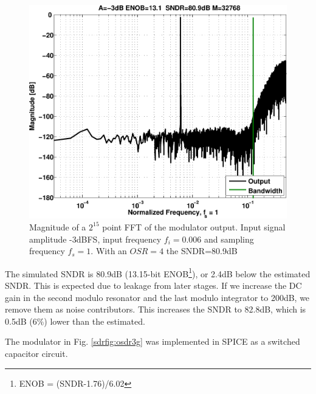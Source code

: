 \begin{figure}[htbp]
\centerline{ \includegraphics[width=\myfigwidth]{graphics/osdr21g}}
  \caption{Magnitude of a $2^{15}$ point FFT of the modulator
    output. Input signal amplitude -3dBFS, input frequency $f_i =
    0.006$ and sampling frequency $f_s = 1$. With an $OSR=4$ the SNDR=80.9dB}
  \label{sdrfig:osdr374}
\end{figure}

The simulated SNDR is
 80.9dB (13.15-bit ENOB\footnote{ENOB = (SNDR-1.76)/6.02}), or 2.4dB below the estimated SNDR. This is expected due to
leakage from later stages. If we increase the DC gain in the second
modulo resonator and the last modulo
integrator to 200dB, we remove
them as noise contributors. This increases the SNDR to 82.8dB, which
is 0.5dB (6\%) lower than the estimated. 

The
modulator in Fig. \ref{sdrfig:osdr3g} was implemented in SPICE as a switched
capacitor circuit. 




